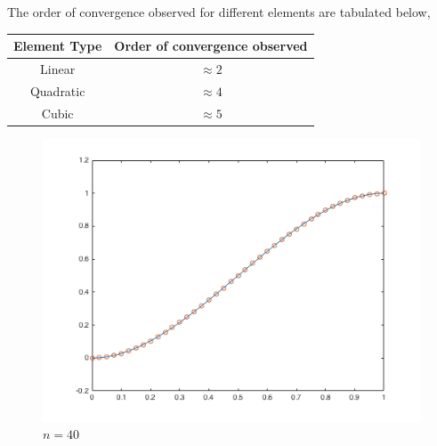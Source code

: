 \begin{example}
The order of convergence observed for different elements are tabulated below,\\
		\begin{center}
			\begin{tabular}{|c|c|}
				\hline
				Element Type & Order of convergence observed\\
				\hline
				Linear & $\approx 2$\\
				Quadratic & $\approx 4$\\
				Cubic & $\approx 5$\\
				\hline						
			\end{tabular}
		\end{center}
		\begin{figure}[h!]
						\includegraphics[scale = 0.8]{images/secondex.png}
						\caption{$n = 40$}	
		\end{figure}
\end{example}

